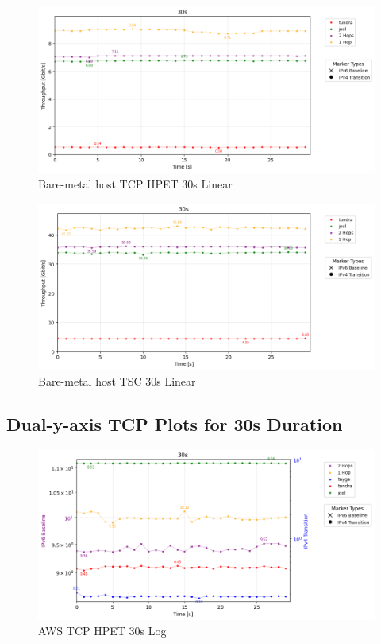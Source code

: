 \begin{figure}[H]
    \centering
    \includegraphics[width=1\textwidth]{resources/finalPlots/appendix/combined/SingleLocal_tcp_sameScale_hpet_30s_linear.png}
    \caption{Bare-metal host TCP HPET 30s Linear}
    \label{fig:single_local_tcp_hpet_30s_linear}
\end{figure}


\begin{figure}[H]
    \centering
    \includegraphics[width=1\textwidth]{resources/finalPlots/appendix/combined/SingleLocal_tcp_sameScale_tsc_30s_linear.png}
    \caption{Bare-metal host TSC 30s Linear}
    \label{fig:single_local_tcp_tsc_30s_linear}
\end{figure}


\subsection*{Dual-y-axis TCP Plots for 30s Duration }



\begin{figure}[H]
    \centering
    \includegraphics[width=1\textwidth]{resources/finalPlots/appendix/jitter/AWS_tcp_dualAxis_hpet_30s_log.png}
    \caption{AWS TCP HPET 30s Log}
    \label{fig:aws_tcp_jitter_hpet_30s_log}
\end{figure}

